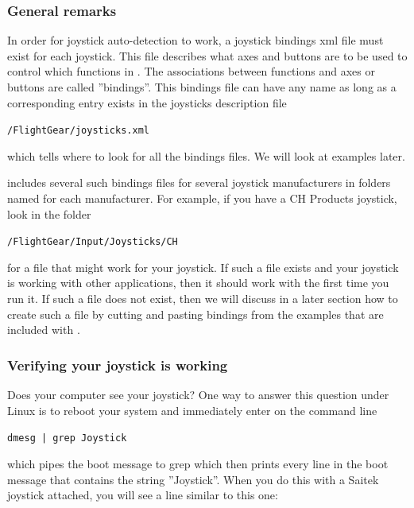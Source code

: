 \subsubsection{General remarks\label{generalremarks}}
In order for joystick auto-detection to work, a joystick bindings xml file
must exist for each joystick. This file describes what axes and buttons are
to be used to control which functions in \FlightGear{}.  The associations
between functions and axes or buttons are called ''bindings''.  This
bindings file can have any name as long as a corresponding entry exists in
the joysticks description file
\medskip

     	\texttt{/FlightGear/joysticks.xml} 
\medskip

\noindent
which tells \FlightGear{} where to look for all the bindings files.  We will
look at examples later.

\FlightGear{} includes several such bindings files for several joystick
manufacturers in folders named for each manufacturer.  For example, if you
have a CH Products joystick, look in the folder
\medskip

    \texttt{/FlightGear/Input/Joysticks/CH}
    \medskip
    
\noindent
for a file that might work for your joystick.  If such a file exists and
your joystick is working with other applications, then it should work with
\FlightGear{} the first time you run it.  If such a file does not exist,
then we will discuss in a later section how to create such a file by cutting
and pasting bindings from the examples that are included with \FlightGear{}.

\subsubsection{Verifying your joystick is working\label{verifying}}
Does your computer see your joystick?  One way to answer this question under Linux is to reboot your system and immediately enter on the command line
\medskip

	\texttt{dmesg | grep Joystick}
\medskip

\noindent
which pipes the boot message to grep which then prints every line in the
boot message that contains the string ''Joystick''.  When you do this with a
Saitek joystick attached, you will see a line similar to this one:
\medskip

